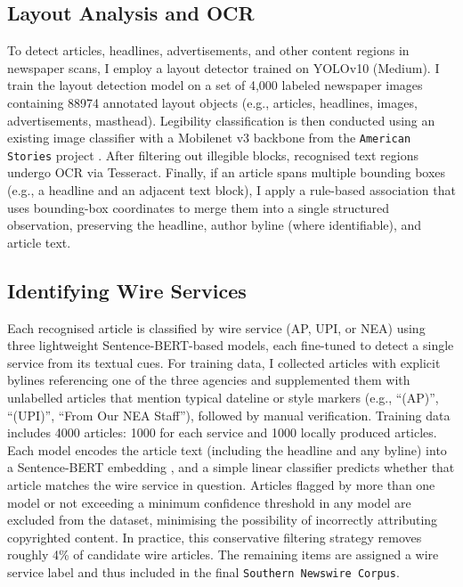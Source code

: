 \documentclass{article}
\begin{document}
\subsection{Layout Analysis and OCR}
To detect articles, headlines, advertisements, and other content regions in newspaper scans, I employ a layout detector trained on YOLOv10 (Medium). I train the layout detection model on a set of 4,000 labeled newspaper images containing 88974 annotated layout objects (e.g., articles, headlines, images, advertisements, masthead). Legibility classification is then conducted using an existing image classifier with a Mobilenet v3 backbone from the \texttt{American Stories} project \cite{dell2024americanstories}. After filtering out illegible blocks, recognised text regions undergo OCR via Tesseract. Finally, if an article spans multiple bounding boxes (e.g., a headline and an adjacent text block), I apply a rule-based association that uses bounding-box coordinates to merge them into a single structured observation, preserving the headline, author byline (where identifiable), and article text.

\subsection{Identifying Wire Services}
Each recognised article is classified by wire service (AP, UPI, or NEA) using three lightweight Sentence-BERT-based models, each fine-tuned to detect a single service from its textual cues. For training data, I collected articles with explicit bylines referencing one of the three agencies and supplemented them with unlabelled articles that mention typical dateline or style markers (e.g., “(AP)”, “(UPI)”, “From Our NEA Staff”), followed by manual verification. Training data includes 4000 articles: 1000 for each service and 1000 locally produced articles. Each model encodes the article text (including the headline and any byline) into a Sentence-BERT embedding \cite{reimers2019}, and a simple linear classifier predicts whether that article matches the wire service in question. Articles flagged by more than one model or not exceeding a minimum confidence threshold in any model are excluded from the dataset, minimising the possibility of incorrectly attributing copyrighted content. In practice, this conservative filtering strategy removes roughly 4\% of candidate wire articles. The remaining items are assigned a wire service label and thus included in the final \texttt{Southern Newswire Corpus}.
\end{document}

